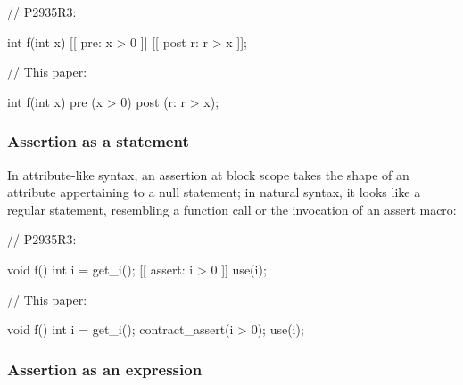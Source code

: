 \begin{minipage}{8cm}
\begin{codeblock}
// P2935R3:

int f(int x) 
  [[ pre: x > 0 ]]
  [[ post r: r > x ]];
\end{codeblock}
\end{minipage}
\begin{minipage}{8cm}
\begin{codeblock}
// This paper:

int f(int x) 
  pre (x > 0)
  post (r: r > x);
\end{codeblock}
\end{minipage}

\subsubsection{Assertion as a statement}

In attribute-like syntax, an assertion at block scope takes the shape of an attribute appertaining to a null statement; in natural syntax, it looks like a regular statement, resembling a function call or the invocation of an assert macro:

\begin{minipage}{8cm}
\begin{codeblock}
// P2935R3:

void f() {
  int i = get_i();
  [[ assert: i > 0 ]]
  use(i);
}
\end{codeblock}
\end{minipage}
\begin{minipage}{8cm}
\begin{codeblock}
// This paper:

void f() {
  int i = get_i();
  contract_assert(i > 0);
  use(i);
}
\end{codeblock}
\end{minipage}




\subsubsection{Assertion as an expression}

